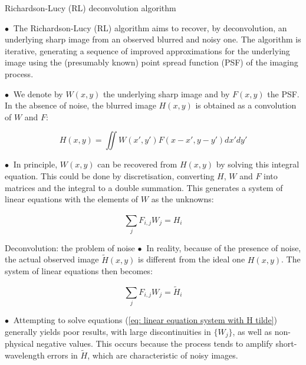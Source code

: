 \documentclass [aspectratio=169]{beamer}
\begin{document}
 \begin{frame}{Richardson-Lucy (RL) deconvolution algorithm }

$\bullet~$ The Richardson-Lucy (RL) algorithm aims to recover, by deconvolution, an underlying sharp image from an observed blurred and noisy one. The algorithm is iterative, generating a sequence of improved approximations for the underlying image using the (presumably known) point spread function (PSF) of the imaging process.

$\bullet~$ We denote by $W(x,y)$ the underlying sharp image and by $F(x,y)$ the PSF. In the absence of noise, the blurred image $H(x,y)$ is obtained as a convolution of $W$ and $F$:

\begin{equation}
H(x,y)=\iint W(x',y') F(x-x',y-y') dx' dy' \label{eq: H ideal}
\end{equation}

$\bullet~$ In principle, $W(x,y)$ can be recovered from $H(x,y)$ by solving this integral equation. This could be done by discretisation, converting $H$, $W$ and $F$ into matrices and the integral to a double summation. This generates a system of linear equations with the elements of $W$ as the unknowns:

\begin{equation}
\sum_{j}^{} F_{i,j}W_j = H_i \label{eq: linear equation system with H} 
\end{equation} 

 \end{frame}
 
 \begin{frame}{Deconvolution: the problem of noise}
$\bullet~$  In reality, because of the presence of noise, the actual observed image $\tilde{H}(x,y)$ is different from the ideal one $H(x,y)$. The system of linear equations then becomes:

\begin{equation}
\sum_{j}^{} F_{i,j}W_j = \tilde{H}_i \label{eq: linear equation system with H tilde} 
\end{equation} 

$\bullet~$  Attempting to solve equations (\ref{eq: linear equation system with H tilde}) generally yields poor results, with large discontinuities in $\{W_j\}$, as well as non-physical negative values. This occurs because the process tends to amplify short-wavelength errors in $\tilde{H}$, which are characteristic of noisy images. 

 \end{frame}
\end{document}
